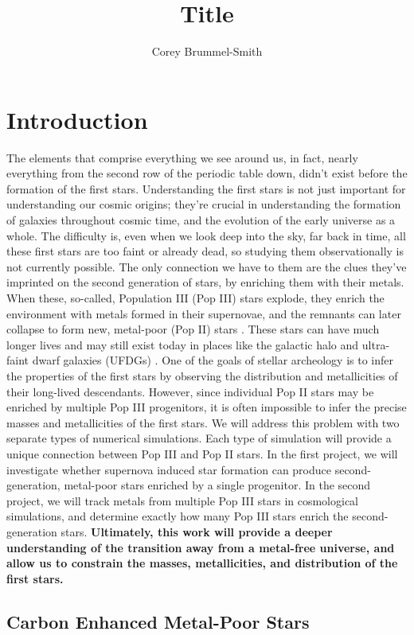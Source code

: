 \documentclass[letterpaper, 12pt]{article}
\begin{document}
\author{Corey Brummel-Smith}
\title{Title}

\section{Introduction}

The elements that comprise everything we see around us, in fact, nearly everything from the second row of the periodic table down, didn't exist before the formation of the first stars. Understanding the first stars is not just important for understanding our cosmic origins; they're crucial in understanding the formation of galaxies throughout cosmic time, and the evolution of the early universe as a whole. The difficulty is, even when we look deep into the sky, far back in time, all these first stars are too faint or already dead, so studying them observationally is not currently possible. The only connection we have to them are the clues they've imprinted on the second generation of stars, by enriching them with their metals. When these, so-called, Population III (Pop III) stars explode, they enrich the environment with metals formed in their supernovae, and the remnants can later collapse to form new, metal-poor (Pop II) stars \citep{Chiaki2019}. These stars can have much longer lives and may still exist today in places like the galactic halo and ultra-faint dwarf galaxies (UFDGs) \citep{Kirby2008}. One of the goals of stellar archeology is to infer the properties of the first stars by observing the distribution and metallicities of their long-lived descendants. However, since individual Pop II stars may be enriched by multiple Pop III progenitors, it is often impossible to infer the precise masses and metallicities of the first stars. We will address this problem with two separate types of numerical simulations. Each type of simulation will provide a unique connection between Pop III and Pop II stars. In the first project, we will investigate whether supernova induced star formation can produce second-generation, metal-poor stars enriched by a single progenitor. In the second project, we will track metals from multiple Pop III stars in cosmological simulations, and determine exactly how many Pop III stars enrich the second-generation stars. \textbf{Ultimately, this work will provide a deeper understanding of the transition away from a metal-free universe, and allow us to constrain the masses, metallicities, and distribution of the first stars.}

\subsection*{Carbon Enhanced Metal-Poor Stars}
\end{document}
